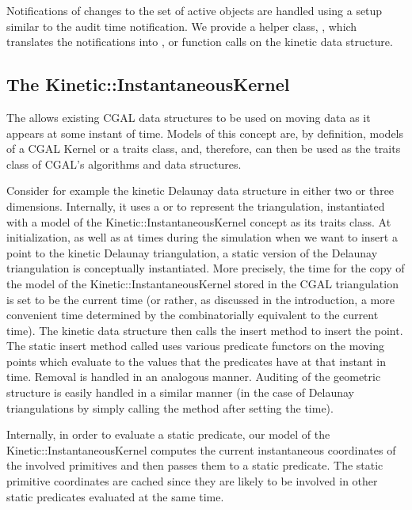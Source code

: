 Notifications of changes to the set of active objects are handled
using a setup similar to the  audit time
notification. We provide a helper class,
, which translates the notifications into ,
 or  function calls on the kinetic data
structure.



\subsection{The Kinetic::InstantaneousKernel}
\label{instantaneous_kernel}

The  allows existing CGAL data structures
to be used on moving data as it appears at some instant of time.
Models of this concept are, by definition, models of a CGAL
Kernel or a traits class, and, therefore, can then be used as
the traits class of CGAL's algorithms and data structures.

Consider for example the kinetic Delaunay data structure in either two
or three dimensions.  Internally, it uses a
 or
 to represent the
triangulation, instantiated with a model of the
Kinetic::InstantaneousKernel concept as its traits class.  At
initialization, as well as at times during the simulation when we want
to insert a point to the kinetic Delaunay triangulation, a static
version of the Delaunay triangulation is conceptually instantiated.
More precisely, the time for the copy of the model of the
Kinetic::InstantaneousKernel stored in the CGAL triangulation is set
to be the current time (or rather, as discussed in the introduction, a
more convenient time determined by the 
combinatorially equivalent to the current time).  The kinetic data
structure then calls the
 insert
method to insert the point.  The static insert method called uses
various predicate functors on the moving points which evaluate to the
values that the predicates have at that instant in time. Removal is
handled in an analogous manner. Auditing of the geometric structure is
easily handled in a similar manner (in the case of Delaunay
triangulations by simply calling the  method after
setting the time).

Internally, in order to evaluate a static predicate, our model of the
Kinetic::InstantaneousKernel computes the current instantaneous
coordinates of the involved primitives and then passes them to a
static predicate. The static primitive coordinates are cached since
they are likely to be involved in other static predicates evaluated at
the same time.


